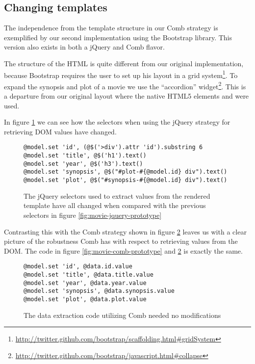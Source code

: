 \documentclass[thesis.tex]{subfiles}
\begin{document}
\subsection{Changing templates}
\label{sec:changing-templates}
The independence from the template structure in our Comb strategy is exemplified
by our second implementation using the Bootstrap library. This version also
exists in both a jQuery and Comb flavor.

The structure of the HTML is quite different from our original implementation,
because Bootstrap requires the user to set up his layout in a grid
system\footnote{\url{http://twitter.github.com/bootstrap/scaffolding.html\#gridSystem}}.
To expand the synopsis and plot of a movie we use the ``accordion''
widget\footnote{\url{http://twitter.github.com/bootstrap/javascript.html\#collapse}}.
This is a departure from our original layout where the native HTML5 elements
 and  were used.

In figure \ref{fig:movie-jquery-bootstrap} we can see how the selectors when
using the jQuery strategy for retrieving DOM values have changed.
\begin{figure}
	\centering
	\begin{lstlisting}
@model.set 'id', (@$('>div').attr 'id').substring 6
@model.set 'title', @$('h1').text()
@model.set 'year', @$('h3').text()
@model.set 'synopsis', @$("#plot-#{@model.id} div").text()
@model.set 'plot', @$("#synopsis-#{@model.id} div").text()
	\end{lstlisting}
	\caption{The jQuery selectors used to extract values from the rendered
	template have all changed when compared with the previous selectors in
	figure \ref{fig:movie-jquery-prototype}}
	\label{fig:movie-jquery-bootstrap}
\end{figure}
Contrasting this with the Comb strategy shown in figure \ref{fig:movie-comb-bootstrap}
leaves us with a clear picture of the robustness Comb has with respect to
retrieving values from the DOM.
The code in figure \ref{fig:movie-comb-prototype} and
\ref{fig:movie-comb-bootstrap} is exactly the same.
\begin{figure}
	\centering
	\begin{lstlisting}
@model.set 'id', @data.id.value
@model.set 'title', @data.title.value
@model.set 'year', @data.year.value
@model.set 'synopsis', @data.synopsis.value
@model.set 'plot', @data.plot.value
	\end{lstlisting}
	\caption{The data extraction code utilizing Comb needed no modifications}
	\label{fig:movie-comb-bootstrap}
\end{figure}
\end{document}
